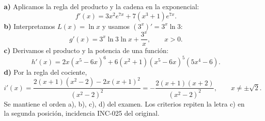\textbf{a)} Aplicamos la regla del producto y la cadena en la exponencial:
\[
 f'(x)=3x^2e^{7x}+7(x^3+1)e^{7x}.
\]
\textbf{b)} Interpretamos $L(x)=\ln x$ y usamos $(3^x)'=3^x\ln3$:
\[
 g'(x)=3^x\ln3\ln x+\frac{3^x}{x},\qquad x>0.
\]
\textbf{c)} Derivamos el producto y la potencia de una función:
\[
 h'(x)=2x(x^5-6x)^6+
 6(x^2+1)(x^5-6x)^5(5x^4-6).
\]
\textbf{d)} Por la regla del cociente,
\[
 i'(x)=\frac{2(x+1)(x^2-2)-2x(x+1)^2}{(x^2-2)^2}
 =-\frac{2(x+1)(x+2)}{(x^2-2)^2},
 \qquad x\ne\pm\sqrt2.
\]
Se mantiene el orden a), b), c), d) del examen. Los criterios repiten la letra c) en la segunda posición, incidencia INC-025 del original.
